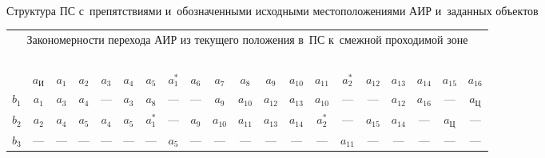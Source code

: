  \begin{figure*} %
   \vspace*{1pt}
\begin{center}
   \mbox{%
\epsfxsize=117.405mm 
}


\vspace*{12pt}

   {\small Структура ПС с~препятствиями и~обозначенными исходными 
местоположениями АИР и~заданных объектов}
\end{center}
\vspace*{6pt}
   \vspace*{6pt}
\begin{center}
{\small \begin{tabular}{|c|c|c|c|c|c|c|c|c|c|c|c|c|c|c|c|c|c|c|c|}
\multicolumn{20}{c}{Закономерности перехода АИР из текущего положения в~ПС к~смежной проходимой зоне}\\
\multicolumn{20}{c}{\ }\\[-3pt]
\hline
&$a_{\mathrm{И}}$&$a_1$&$a_2$&$a_3$&$a_4$&$a_5$&$a_1^*$&$a_6$&$a_7$&$a_8$&$a_9$& 
$a_{10}$&$a_{11}$&$a_2^*$&$a_{12}$&$a_{13}$&$a_{14}$&$a_{15}$&$a_{16}$\\
\hline
$b_1$&$a_1$&$a_3$&$a_4$&---&$a_3$&$a_8$&---&---&$a_9$&$a_{10}$&$a_{12}$&$a_{13}$&$a_{10}$&---&---&$a_{12}$&$a_{16}$&---&$a_{\mathrm{Ц}}$\\
$b_2$&$a_2$&$a_4$&$a_5$&$a_4$&$a_5$&$a_1^*$&---
&$a_9$&$a_{10}$&$a_{11}$&$a_{13}$&$a_{14}$&$a_2^*$&---&$a_{15}$&$a_{14}$&---&$a_{\mathrm{Ц}}$
&---\\
$b_3$&---&---&---&---&---&---&$a_5$&---&---&---&---&---&---&$a_{11}$&---&---&---&---&---\\
\hline
\end{tabular}
}
\end{center}
\end{figure*}

